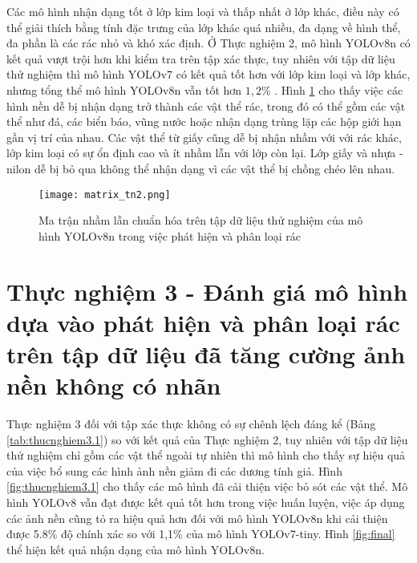 \documentclass[../the.tex]{subfiles}
\begin{document}
{\fontsize{13}{12} \selectfont

    Các mô hình nhận dạng tốt ở lớp kim loại và thấp nhất ở lớp khác,
    điều này có thể giải thích bằng tính đặc trưng của lớp khác quá nhiều, đa dạng về hình thể, đa phần là các rác nhỏ và khó xác định.
    Ở Thực nghiệm 2, mô hình YOLOv8n có kết quả vượt trội hơn khi kiểm tra trên tập xác thực, tuy nhiên với tập dữ liệu thử nghiệm thì mô hình YOLOv7 có kết quả tốt hơn với lớp kim loại và lớp khác, nhưng tổng thể mô hình YOLOv8n vẫn tốt hơn $1,2\%$ .
    Hình \ref{fig:thucnghiem2.1} cho thấy việc các hình nền dễ bị nhận dạng trở thành các vật thể rác, trong đó có thể gồm các vật thể như đá, các biển báo, vũng nước hoặc nhận dạng trùng lặp các hộp giới hạn gần vị trí của nhau.
    Các vật thể từ giấy cũng dễ bị nhận nhầm với với rác khác, lớp kim loại có sự ổn định cao và ít nhầm lẫn với lớp còn lại. Lớp giấy và nhựa - nilon dễ bị bỏ qua không thể nhận dạng vì các vật thể bị chồng chéo lên nhau.

}


\begin{figure}[H]
    \centering
    \texttt{[image: matrix\_tn2.png]}
    \caption{Ma trận nhầm lẫn chuẩn hóa trên tập dữ liệu thử nghiệm của mô hình YOLOv8n trong việc phát hiện và phân loại rác}
    \label{fig:thucnghiem2.1}
\end{figure}

\section{Thực nghiệm 3 - Đánh giá mô hình dựa vào phát hiện và phân loại rác trên tập dữ liệu đã tăng cường ảnh nền không có nhãn} 
{\fontsize{13}{12} \selectfont

Thực nghiệm 3 đối với tập xác thực không có sự chênh lệch đáng kể (Bảng \ref{tab:thucnghiem3.1}) so với kết quả của Thực nghiệm 2, tuy nhiên với tập dữ liệu thử nghiệm chỉ gồm các vật thể ngoài tự nhiên thì mô hình
cho thấy sự hiệu quả của việc bổ sung các hình ảnh nền giảm đi các dương tính giả. Hình \ref{fig:thucnghiem3.1} cho thấy các mô hình đã cải thiện việc bỏ sót các vật thể.
Mô hình YOLOv8 vẫn đạt được kết quả tốt hơn trong việc huấn luyện, việc áp dụng các ảnh nền cũng tỏ ra hiệu quả hơn đối với mô hình YOLOv8n khi cải thiện được 5.8\% độ chính xác so với 1,1\% của mô hình YOLOv7-tiny.
Hình \ref{fig:final} thể hiện kết quả nhận dạng của mô hình YOLOv8n.

}
\end{document}
